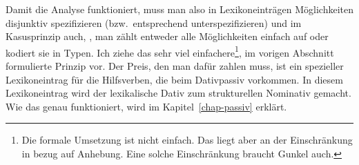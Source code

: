 \z
Damit die Analyse funktioniert, muss man also in Lexikoneinträgen Möglichkeiten disjunktiv spezifizieren (bzw.\
entsprechend unterspezifizieren) und im Kasusprinzip auch, \dash, man zählt entweder
alle Möglichkeiten einfach auf oder kodiert sie in Typen. 
Ich ziehe das sehr viel einfachere\footnote{
  Die formale Umsetzung ist nicht einfach. Das liegt aber an der Einschränkung in bezug auf Anhebung.
  Eine solche Einschränkung braucht Gunkel auch.%
}, im vorigen Abschnitt formulierte Prinzip
vor. Der Preis, den man dafür zahlen muss, ist ein spezieller
Lexikoneintrag für die Hilfsverben, die beim Dativpassiv vorkommen. In diesem Lexikoneintrag
wird der lexikalische Dativ zum strukturellen Nominativ gemacht. Wie das genau funktioniert,
wird im Kapitel~\ref{chap-passiv} erklärt.

